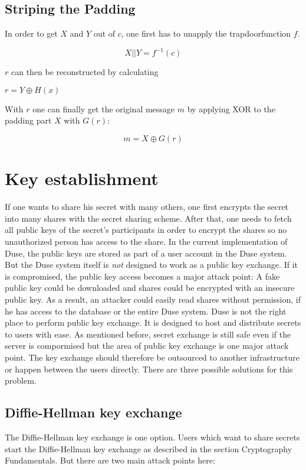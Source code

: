\subsection{Striping the Padding}

In order to get $X$ and $Y$ out of $c$, one first has to unapply the
trapdoorfunction $f$.

$$X || Y = f^{-1}(c)$$

$r$ can then be reconstructed by calculating

$r = Y \oplus H(x)$

With $r$ one can finally get the original message $m$ by applying XOR
to the padding part $X$ with $G(r)$:

$$m = X \oplus G(r)$$

\section{Key establishment}
\label{sec:key_establishment}

If one wants to share his secret with many others, one first encrypts the
secret into many shares with the secret sharing scheme. After that, one needs
to fetch all public keys of the secret's participants in order to encrypt the
shares so no unauthorized person has access to the share. In the current
implementation of Duse, the public keys are stored as part of a user account
in the Duse system. But the Duse system itself is \textit{not} designed to
work as a public key exchange. If it is compromised, the public key access
becomes a major attack point: A fake public key could be downloaded and shares
could be encrypted with an insecure public key. As a result, an attacker
could easily read shares without permission, if he has access to the database
or the entire Duse system. Duse is not the right place to perform public
key exchange. It is designed to host and distribute secrets to users with ease.
As mentioned before, secret exchange is still safe even if the server is compormised
but the area of public key exchange is one major attack point.
The key exchange should therefore be outsourced to another
infrastructure or happen between the users directly. There are three possible
solutions for this problem.

\subsection{Diffie-Hellman key exchange}

The Diffie-Hellman key exchange is one option. Users which want to share secrets
start the Diffie-Hellman key exchange as described in the section Cryptography
Fundamentals. But there are two main attack points here:

